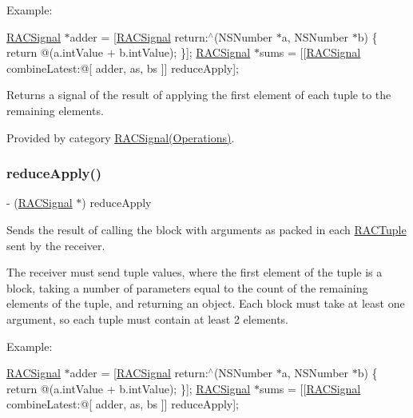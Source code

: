 Example\+:

\mbox{\hyperlink{interface_r_a_c_signal}{R\+A\+C\+Signal}} $\ast$adder = \mbox{[}\mbox{\hyperlink{interface_r_a_c_signal}{R\+A\+C\+Signal}} return\+:$^\wedge$(N\+S\+Number $\ast$a, N\+S\+Number $\ast$b) \{ return @(a.\+int\+Value + b.\+int\+Value); \}\mbox{]}; \mbox{\hyperlink{interface_r_a_c_signal}{R\+A\+C\+Signal}} $\ast$sums = \mbox{[}\mbox{[}\mbox{\hyperlink{interface_r_a_c_signal}{R\+A\+C\+Signal}} combine\+Latest\+:@\mbox{[} adder, as, bs \mbox{]}\mbox{]} reduce\+Apply\mbox{]};

Returns a signal of the result of applying the first element of each tuple to the remaining elements. 

Provided by category \mbox{\hyperlink{category_r_a_c_signal_07_operations_08_a60241be15dba6de172d2ab14be09b657}{R\+A\+C\+Signal(\+Operations)}}.

\mbox{\label{interface_r_a_c_signal_a60241be15dba6de172d2ab14be09b657}} 
\subsubsection{\texorpdfstring{reduce\+Apply()}{reduceApply()}\hspace{0.1cm}{\footnotesize\ttfamily [3/3]}}
{\footnotesize\ttfamily -\/ (\mbox{\hyperlink{interface_r_a_c_signal}{R\+A\+C\+Signal}} $\ast$) reduce\+Apply \begin{DoxyParamCaption}{ }\end{DoxyParamCaption}}

Sends the result of calling the block with arguments as packed in each \mbox{\hyperlink{interface_r_a_c_tuple}{R\+A\+C\+Tuple}} sent by the receiver.

The receiver must send tuple values, where the first element of the tuple is a block, taking a number of parameters equal to the count of the remaining elements of the tuple, and returning an object. Each block must take at least one argument, so each tuple must contain at least 2 elements.

Example\+:

\mbox{\hyperlink{interface_r_a_c_signal}{R\+A\+C\+Signal}} $\ast$adder = \mbox{[}\mbox{\hyperlink{interface_r_a_c_signal}{R\+A\+C\+Signal}} return\+:$^\wedge$(N\+S\+Number $\ast$a, N\+S\+Number $\ast$b) \{ return @(a.\+int\+Value + b.\+int\+Value); \}\mbox{]}; \mbox{\hyperlink{interface_r_a_c_signal}{R\+A\+C\+Signal}} $\ast$sums = \mbox{[}\mbox{[}\mbox{\hyperlink{interface_r_a_c_signal}{R\+A\+C\+Signal}} combine\+Latest\+:@\mbox{[} adder, as, bs \mbox{]}\mbox{]} reduce\+Apply\mbox{]};

